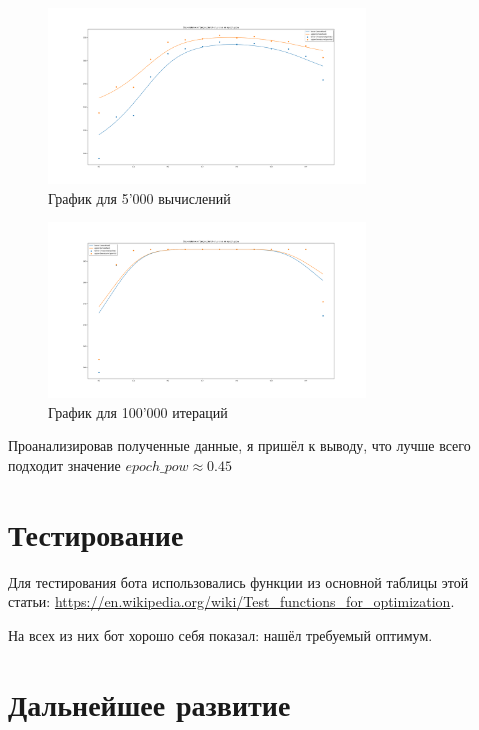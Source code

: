 \documentclass[11pt]{article}
\begin{document}
    \begin{figure}[h]
        \centering
        \includegraphics[width=0.75\textwidth]{exploring_optimal_epoch_pow_5000_iterations.png}
        \caption{График для 5'000 вычислений}
        \label{fig:epoch-pow-5000}
    \end{figure}
    \FloatBarrier

    \begin{figure}[h]
        \centering
        \includegraphics[width=0.75\textwidth]{exploring_optimal_epoch_pow_100000_iterations.png}
        \caption{График для 100'000 итераций}
        \label{fig:epoch-pow-100000}
    \end{figure}
    \FloatBarrier

    Проанализировав полученные данные, я пришёл к выводу, что лучше всего подходит значение $epoch\_pow \approx 0.45$

    \section{Тестирование}\label{sec:testing}
    Для тестирования бота использовались функции из основной таблицы этой статьи:
    \url{https://en.wikipedia.org/wiki/Test_functions_for_optimization}.

    На всех из них бот хорошо себя показал: нашёл требуемый оптимум.

    \section{Дальнейшее развитие}\label{sec:subsequent-development}
\end{document}
